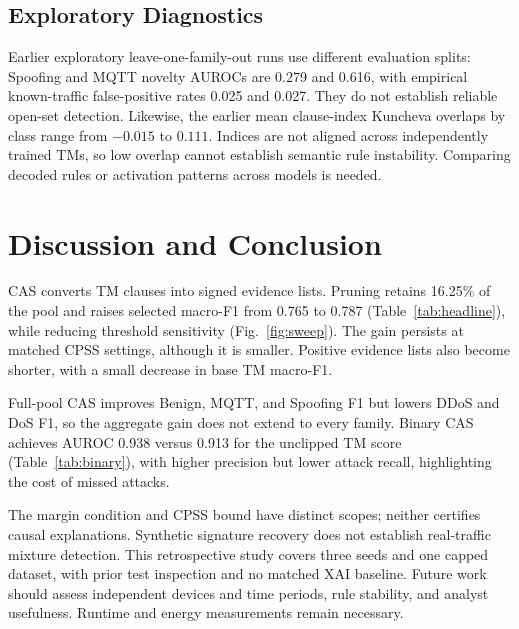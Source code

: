 \documentclass[conference]{IEEEtran}
\begin{document}
\subsection{Exploratory Diagnostics}
\label{sec:taskb}\label{sec:stability}
Earlier exploratory leave-one-family-out runs use different evaluation
splits: Spoofing and MQTT novelty AUROCs are 0.279 and 0.616,
with empirical known-traffic false-positive rates 0.025 and 0.027.
They do not establish reliable open-set detection.
Likewise, the earlier mean clause-index Kuncheva overlaps by class
range from $-0.015$ to $0.111$. Indices are not aligned across
independently trained TMs, so low overlap cannot establish semantic
rule instability. Comparing decoded rules or activation patterns
across models is needed.

\section{Discussion and Conclusion}
CAS converts TM clauses into signed evidence lists. Pruning retains 16.25\% of the pool and
raises selected macro-F1 from 0.765 to 0.787
(Table~\ref{tab:headline}), while reducing threshold sensitivity
(Fig.~\ref{fig:sweep}). The gain persists at matched CPSS settings,
although it is smaller. Positive evidence lists also become shorter,
with a small decrease in base TM macro-F1.

Full-pool CAS improves Benign, MQTT, and Spoofing F1 but lowers DDoS
and DoS F1, so the aggregate gain does not extend to every family.
Binary CAS achieves AUROC 0.938 versus 0.913 for the unclipped TM
score (Table~\ref{tab:binary}), with higher precision but lower attack
recall, highlighting the cost of missed attacks.

The margin condition and CPSS bound have distinct scopes; neither
certifies causal explanations. Synthetic signature recovery does not
establish real-traffic mixture detection. This retrospective study
covers three seeds and one capped dataset, with prior test inspection
and no matched XAI baseline. Future work should assess independent
devices and time periods, rule stability, and analyst usefulness.
Runtime and energy measurements remain necessary.

\clearpage
\end{document}
